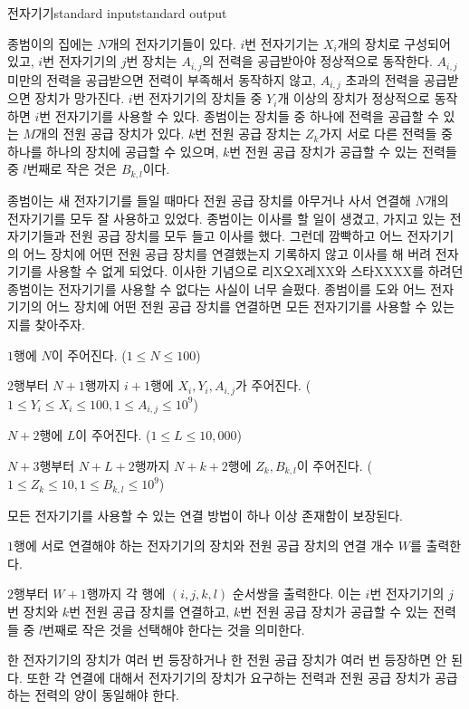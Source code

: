 \begin{problem}{전자기기}{standard input}{standard output}

종범이의 집에는 $N$개의 전자기기들이 있다. $i$번 전자기기는 $X_i$개의 장치로 구성되어 있고, $i$번 전자기기의 $j$번 장치는 $A_{i,j}$의 전력을 공급받아야 정상적으로 동작한다. $A_{i,j}$ 미만의 전력을 공급받으면 전력이 부족해서 동작하지 않고, $A_{i,j}$ 초과의 전력을 공급받으면 장치가 망가진다. $i$번 전자기기의 장치들 중 $Y_i$개 이상의 장치가 정상적으로 동작하면 $i$번 전자기기를 사용할 수 있다. 종범이는 장치들 중 하나에 전력을 공급할 수 있는 $M$개의 전원 공급 장치가 있다. $k$번 전원 공급 장치는 $Z_k$가지 서로 다른 전력들 중 하나를 하나의 장치에 공급할 수 있으며, $k$번 전원 공급 장치가 공급할 수 있는 전력들 중 $l$번째로 작은 것은 $B_{k,l}$이다.

종범이는 새 전자기기를 들일 때마다 전원 공급 장치를 아무거나 사서 연결해 $N$개의 전자기기를 모두 잘 사용하고 있었다. 종범이는 이사를 할 일이 생겼고, 가지고 있는 전자기기들과 전원 공급 장치를 모두 들고 이사를 했다. 그런데 깜빡하고 어느 전자기기의 어느 장치에 어떤 전원 공급 장치를 연결했는지 기록하지 않고 이사를 해 버려 전자기기를 사용할 수 없게 되었다. 이사한 기념으로 리X오X레XX와 스타XXXX를 하려던 종범이는 전자기기를 사용할 수 없다는 사실이 너무 슬펐다. 종범이를 도와 어느 전자기기의 어느 장치에 어떤 전원 공급 장치를 연결하면 모든 전자기기를 사용할 수 있는지를 찾아주자.

\InputFile
$1$행에 $N$이 주어진다. ($1 \le N \le 100$)

$2$행부터 $N+1$행까지 $i+1$행에 $X_i , Y_i , A_{i,j}$가 주어진다. ($1 \le Y_i \le X_i \le 100, 1 \le A_{i,j} \le 10^9$)

$N+2$행에 $L$이 주어진다. ($1 \le L \le 10,000$)

$N+3$행부터 $N+L+2$행까지 $N+k+2$행에 $Z_k, B_{k,l}$이 주어진다. ($1 \le Z_k \le 10, 1 \le B_{k,l} \le 10^9$)

모든 전자기기를 사용할 수 있는 연결 방법이 하나 이상 존재함이 보장된다.

\OutputFile
$1$행에 서로 연결해야 하는 전자기기의 장치와 전원 공급 장치의 연결 개수 $W$를 출력한다.

$2$행부터 $W+1$행까지 각 행에 $(i, j, k, l)$ 순서쌍을 출력한다. 이는 $i$번 전자기기의 $j$번 장치와 $k$번 전원 공급 장치를 연결하고, $k$번 전원 공급 장치가 공급할 수 있는 전력들 중 $l$번째로 작은 것을 선택해야 한다는 것을 의미한다.

한 전자기기의 장치가 여러 번 등장하거나 한 전원 공급 장치가 여러 번 등장하면 안 된다. 또한 각 연결에 대해서 전자기기의 장치가 요구하는 전력과 전원 공급 장치가 공급하는 전력의 양이 동일해야 한다.


\end{problem}
